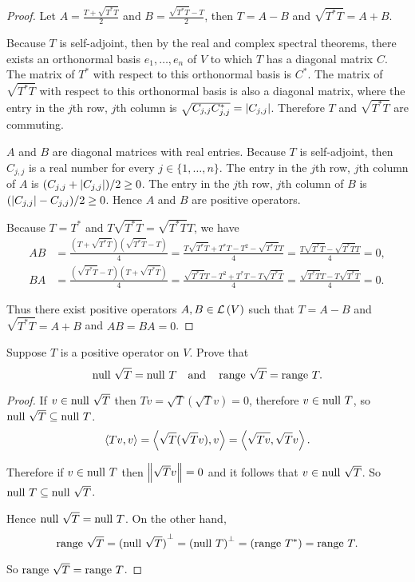 \begin{proof}
    Let $A = \frac{T + \sqrt{T^{*}T}}{2}$ and $B = \frac{\sqrt{T^{*}T} - T}{2}$, then $T = A - B$ and $\sqrt{T^{*}T} = A + B$.

    Because $T$ is self-adjoint, then by the real and complex spectral theorems, there exists an orthonormal basis $e_{1}, \ldots, e_{n}$ of $V$ to which $T$ has a diagonal matrix $C$. The matrix of $T^{*}$ with respect to this orthonormal basis is $C^{*}$. The matrix of $\sqrt{T^{*}T}$ with respect to this orthonormal basis is also a diagonal matrix, where the entry in the $j$th row, $j$th column is $\sqrt{C_{j,j}C^{*}_{j,j}} = \left\vert{C_{j,j}}\right\vert$. Therefore $T$ and $\sqrt{T^{*}T}$ are commuting.

    $A$ and $B$ are diagonal matrices with real entries. Because $T$ is self-adjoint, then $C_{j,j}$ is a real number for every $j\in\{1,\ldots, n\}$. The entry in the $j$th row, $j$th column of $A$ is $(C_{j,j} + \left\vert{C_{j,j}}\right\vert)/2 \geq 0$. The entry in the $j$th row, $j$th column of $B$ is $(\left\vert{C_{j,j}}\right\vert - C_{j,j})/2 \geq 0$. Hence $A$ and $B$ are positive operators.

    Because $T = T^{*}$ and $T\sqrt{T^{*}T} = \sqrt{T^{*}T}T$, we have
    \begin{align*}
        AB & = \frac{(T + \sqrt{T^{*}T})(\sqrt{T^{*}T} - T)}{4} = \frac{T\sqrt{T^{*}T} + T^{*}T - T^{2} - \sqrt{T^{*}T}T}{4} = \frac{T\sqrt{T^{*}T} - \sqrt{T^{*}T}T}{4} = 0, \\
        BA & = \frac{(\sqrt{T^{*}T} - T)(T + \sqrt{T^{*}T})}{4} = \frac{\sqrt{T^{*}T}T - T^{2} + T^{*}T - T\sqrt{T^{*}T}}{4} = \frac{\sqrt{T^{*}T}T - T\sqrt{T^{*}T}}{4} = 0.
    \end{align*}

    Thus there exist positive operators $A, B\in\mathcal{L}\left({V}\right)$ such that $T = A - B$ and $\sqrt{T^{*}T} = A + B$ and $AB = BA = 0$.
\end{proof}
\newpage

\begin{exercise}
    Suppose $T$ is a positive operator on $V$. Prove that
    \[
        \operatorname{null}\,{\sqrt{T}} = \operatorname{null}\,{T}\quad\text{and}\quad\operatorname{range}\,{\sqrt{T}} = \operatorname{range}\,{T}.
    \]
\end{exercise}

\begin{proof}
    If $v\in \operatorname{null}\,{\sqrt{T}}$ then $Tv = \sqrt{T}(\sqrt{T}v) = 0$, therefore $v\in\operatorname{null}\,{T}$, so $\operatorname{null}\,{\sqrt{T}}\subseteq\operatorname{null}\,{T}$.
    \[
        \left\langle{Tv, v}\right\rangle = \left\langle{\sqrt{T}(\sqrt{T}v), v}\right\rangle = \left\langle{\sqrt{Tv}, \sqrt{T}v}\right\rangle.
    \]

    Therefore if $v\in\operatorname{null}\,{T}$ then $\left\Vert{\sqrt{T}v}\right\Vert = 0$ and it follows that $v\in\operatorname{null}\,{\sqrt{T}}$. So $\operatorname{null}\,{T}\subseteq\operatorname{null}\,{\sqrt{T}}$.

    Hence $\operatorname{null}\,{\sqrt{T}} = \operatorname{null}\,{T}$. On the other hand,
    \[
        \operatorname{range}\,{\sqrt{T}} = {(\operatorname{null}\,{\sqrt{T}})}^{\bot} = {(\operatorname{null}\,{T})}^{\bot} = (\operatorname{range}\,{T^{*}}) = \operatorname{range}\,{T}.
    \]

    So $\operatorname{range}\,{\sqrt{T}} = \operatorname{range}\,{T}$.
\end{proof}
\newpage

